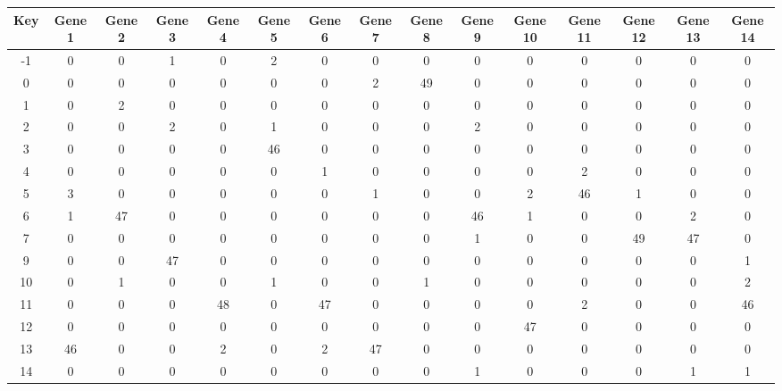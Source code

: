 \begin{tabular}{|c|c|c|c|c|c|c|c|c|c|c|c|c|c|c|}
\hline
Key & Gene 1 & Gene 2 & Gene 3 & Gene 4 & Gene 5 & Gene 6 & Gene 7 & Gene 8 & Gene 9 & Gene 10 & Gene 11 & Gene 12 & Gene 13 & Gene 14 \\
\hline
-1 & 0 & 0 & 1 & 0 & 2 & 0 & 0 & 0 & 0 & 0 & 0 & 0 & 0 & 0 \\
0 & 0 & 0 & 0 & 0 & 0 & 0 & 2 & 49 & 0 & 0 & 0 & 0 & 0 & 0 \\
1 & 0 & 2 & 0 & 0 & 0 & 0 & 0 & 0 & 0 & 0 & 0 & 0 & 0 & 0 \\
2 & 0 & 0 & 2 & 0 & 1 & 0 & 0 & 0 & 2 & 0 & 0 & 0 & 0 & 0 \\
3 & 0 & 0 & 0 & 0 & 46 & 0 & 0 & 0 & 0 & 0 & 0 & 0 & 0 & 0 \\
4 & 0 & 0 & 0 & 0 & 0 & 1 & 0 & 0 & 0 & 0 & 2 & 0 & 0 & 0 \\
5 & 3 & 0 & 0 & 0 & 0 & 0 & 1 & 0 & 0 & 2 & 46 & 1 & 0 & 0 \\
6 & 1 & 47 & 0 & 0 & 0 & 0 & 0 & 0 & 46 & 1 & 0 & 0 & 2 & 0 \\
7 & 0 & 0 & 0 & 0 & 0 & 0 & 0 & 0 & 1 & 0 & 0 & 49 & 47 & 0 \\
9 & 0 & 0 & 47 & 0 & 0 & 0 & 0 & 0 & 0 & 0 & 0 & 0 & 0 & 1 \\
10 & 0 & 1 & 0 & 0 & 1 & 0 & 0 & 1 & 0 & 0 & 0 & 0 & 0 & 2 \\
11 & 0 & 0 & 0 & 48 & 0 & 47 & 0 & 0 & 0 & 0 & 2 & 0 & 0 & 46 \\
12 & 0 & 0 & 0 & 0 & 0 & 0 & 0 & 0 & 0 & 47 & 0 & 0 & 0 & 0 \\
13 & 46 & 0 & 0 & 2 & 0 & 2 & 47 & 0 & 0 & 0 & 0 & 0 & 0 & 0 \\
14 & 0 & 0 & 0 & 0 & 0 & 0 & 0 & 0 & 1 & 0 & 0 & 0 & 1 & 1 \\
\hline
\end{tabular}